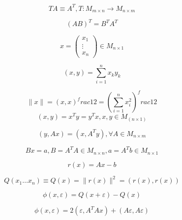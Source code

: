 \begin{equation}
	TA \equiv A^T, T: M_{m\times n} \rightarrow M_{n\times m}
\end{equation}

\begin{equation}
	(AB) ^ T = B^T A^T
\end{equation}

\begin{equation}
	x = \begin{pmatrix}
		x_1\\
		\vdots\\
		x_n
	\end{pmatrix}
	\in M_{n\times 1}
\end{equation}

\begin{equation}
	(x, y) = \sum_{i=1}^n x_k y_k
\end{equation}

\begin{equation}
	\|x \| = (x, x)^frac{1}{2} = (\sum_{i=1}^n x_i^2)^frac{1}{2}
\end{equation}
\begin{equation}
	(x, y) = x^T y = y^T x, x,y \in M_(n \times 1 )
\end{equation}

\begin{equation}
	(y, Ax) = (x, A^T y), \forall A \in M_{n\times m}
\end{equation}
	

\begin{equation}
	Bx = a, B = A^T A \in M_{n\times n}, a=A^T b \in M_{n\times 1}
\end{equation}

\begin{equation}
	r(x) = Ax - b
\end{equation}

\begin{equation}
	Q(x_1 \dots x_n) \equiv Q(x) = \|r(x)\| ^2 = (r(x), r(x))
\end{equation}

\begin{equation}
	\phi (x, \varepsilon ) = Q (x + \varepsilon ) - Q(x)
\end{equation}

\begin{equation}
	\phi (x, \varepsilon ) = 2(\varepsilon, A^T A x) + (A\varepsilon, A\varepsilon)
\end{equation}